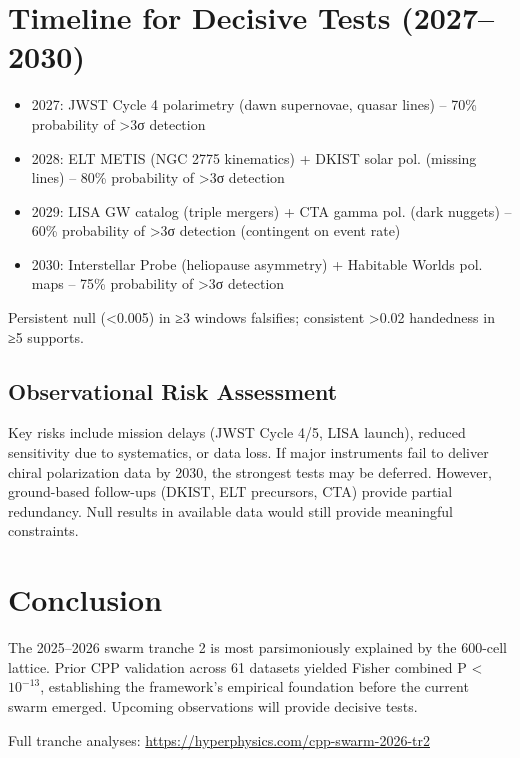 \documentclass[11pt]{article}
\begin{document}
\section{Timeline for Decisive Tests (2027–2030)}
\begin{itemize}[leftmargin=*]
    \item 2027: JWST Cycle 4 polarimetry (dawn supernovae, quasar lines) – 70\% probability of >3σ detection
    \item 2028: ELT METIS (NGC 2775 kinematics) + DKIST solar pol. (missing lines) – 80\% probability of >3σ detection
    \item 2029: LISA GW catalog (triple mergers) + CTA gamma pol. (dark nuggets) – 60\% probability of >3σ detection (contingent on event rate)
    \item 2030: Interstellar Probe (heliopause asymmetry) + Habitable Worlds pol. maps – 75\% probability of >3σ detection
\end{itemize}

Persistent null (<0.005) in ≥3 windows falsifies; consistent >0.02 handedness in ≥5 supports.

\subsection{Observational Risk Assessment}
Key risks include mission delays (JWST Cycle 4/5, LISA launch), reduced sensitivity due to systematics, or data loss. If major instruments fail to deliver chiral polarization data by 2030, the strongest tests may be deferred. However, ground-based follow-ups (DKIST, ELT precursors, CTA) provide partial redundancy. Null results in available data would still provide meaningful constraints.

\section{Conclusion}
The 2025--2026 swarm tranche 2 is most parsimoniously explained by the 600-cell lattice. Prior CPP validation across 61 datasets yielded Fisher combined P < $10^{-13}$, establishing the framework's empirical foundation before the current swarm emerged. Upcoming observations will provide decisive tests.

Full tranche analyses: \url{https://hyperphysics.com/cpp-swarm-2026-tr2}
\end{document}
